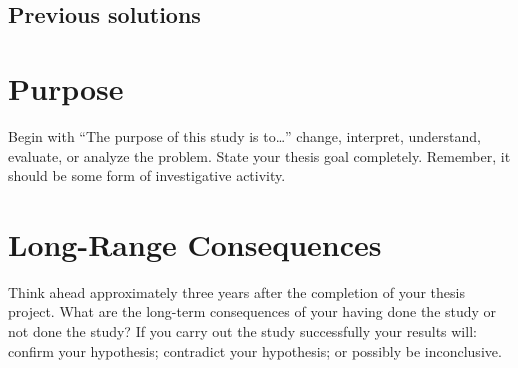 \subsection{Previous solutions}

\section{Purpose}
Begin with “The purpose of this study is to…” change, interpret, understand, evaluate, or analyze the problem.
State your thesis goal completely. Remember, it should be some form of investigative activity.\

\section{Long-Range Consequences}
Think ahead approximately three years after the completion of your thesis project. What are the long-term consequences of your having done the study or not done the study?
If you carry out the study successfully your results will: confirm your hypothesis; contradict your hypothesis; or possibly be inconclusive.
